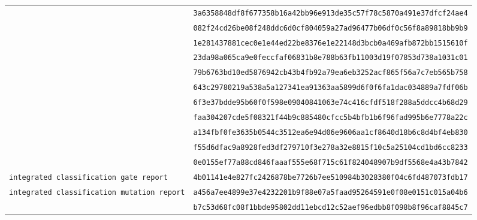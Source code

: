\documentclass[10pt]{article}
\newcommand{\sha}[1]{\nolinkurl{#1}}
\begin{document}
\begin{longtable}{L{.55\linewidth}L{.39\linewidth}}
& \sha{3a6358848df8f677358b16a42bb96e913de35c57f78c5870a491e37dfcf24ae4}\\
& \sha{082f24cd26be08f248ddc6d0cf804059a27ad96477b06df0c56f8a89818bb9b9}\\
& \sha{1e281437881cec0e1e44ed22be8376e1e22148d3bcb0a469afb872bb1515610f}\\
& \sha{23da98a065ca9e0feccfaf06831b8e788b63fb11003d19f07853d738a1031c01}\\
& \sha{79b6763bd10ed5876942cb43b4fb92a79ea6eb3252acf865f56a7c7eb565b758}\\
& \sha{643c29780219a538a5a127341ea91363aa5899d6f0f6fa1dac034889a7fdf06b}\\
& \sha{6f3e37bdde95b60f0f598e09040841063e74c416cfdf518f288a5ddcc4b68d29}\\
& \sha{faa304207cde5f08321f44b9c885480cfcc5b4bfb1b6f96fad995b6e7778a22c}\\
& \sha{a134fbf0fe3635b0544c3512ea6e94d06e9606aa1cf8640d18b6c8d4bf4eb830}\\
& \sha{f55d6dfac9a8928fed3df279710f3e278a32e8815f10c5a25104cd1bd6cc8233}\\
& \sha{0e0155ef77a88cd846faaaf555e68f715c61f824048907b9df5568e4a43b7842}\\
\texttt{integrated classification gate report}
& \sha{4b01141e4e827fc2426878be7726b7ee510984b3028380f04c6fd487073fdb17}\\
\texttt{integrated classification mutation report}
& \sha{a456a7ee4899e37e4232201b9f88e07a5faad95264591e0f08e0151c015a04b6}\\
& \sha{b7c53d68fc08f1bbde95802dd11ebcd12c52aef96edbb8f098b8f96caf8845c7}\\

\end{longtable}
\end{document}
